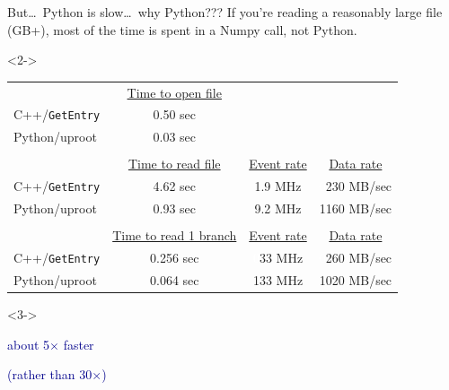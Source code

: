 \documentclass[aspectratio=169]{beamer}
\begin{document}
\begin{frame}{But\ldots\ Python is slow\ldots\ why Python???}
\vspace{0.5 cm}
{\large If you're reading a reasonably large file (GB+), most of the time is spent in a Numpy call, not Python.}

\vspace{0.5 cm}
\begin{uncoverenv}<2->
\begin{tabular}{l c c c}
& \underline{Time to open file} & & \\
C++/{\tt GetEntry} & 0.50 sec & & \\
Python/uproot & 0.03 sec & & \\
& & & \\
 & \underline{Time to read file} & \underline{Event rate} & \underline{Data rate} \\
C++/{\tt GetEntry} & 4.62 sec & 1.9 MHz & \textcolor{white}{0}230 MB/sec \\
Python/uproot & 0.93 sec & 9.2 MHz & 1160 MB/sec \\
& & & \\
& \underline{Time to read 1 branch} & \underline{Event rate} & \underline{Data rate} \\
C++/{\tt GetEntry} & 0.256 sec & \textcolor{white}{0}33 MHz & \textcolor{white}{0}260 MB/sec \\
Python/uproot & 0.064 sec & 133 MHz & 1020 MB/sec
\end{tabular}
\end{uncoverenv}

\vspace{-5.5 cm}\hfill\begin{minipage}{0.35\linewidth}
\begin{uncoverenv}<3->
\begin{center}
\large
\textcolor{darkblue}{about 5$\times$ faster}

\vspace{0.1 cm}
\textcolor{darkblue}{(rather than 30$\times$)}
\end{center}
\end{uncoverenv}
\vspace{5.5 cm}
\end{minipage}
\end{frame}
\end{document}
